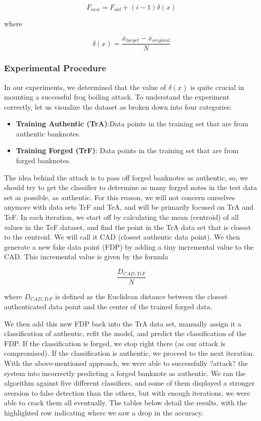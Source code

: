 \documentclass{article}
\begin{document}
\begin{equation}
F_{new} = F_{old} + (i - 1)\delta(x)
\end{equation}

where

\begin{equation}
\delta(x) = \frac{\bar{x}_{target}-\bar{x}_{original}}{N}
\end{equation}

\subsubsection{Experimental Procedure}

In our experiments, we determined that the value of $\delta(x)$ is quite crucial in mounting a successful frog boiling attack. To understand the experiment correctly, let us visualize the dataset as broken down into four categories: 

\begin{itemize}
  \item \textbf{Training Authentic (TrA)}:Data points in the training set that are from authentic banknotes.
  \item \textbf{Training Forged (TrF)}: Data points in the training set that are from forged banknotes.
\end{itemize}

The idea behind the attack is to pass off forged banknotes as authentic, so, we should try to get the classifier to determine as many forged notes in the test data set as possible, as authentic. For this reason, we will not concern ourselves anymore with data sets TrF and TeA, and will be primarily focused on TrA and TeF. In each iteration, we start off by calculating the mean (centroid) of all values in the TeF dataset, and find the point in the TrA data set that is closest to the centroid. We will call it CAD (closest authentic data point). We then generate a new fake data point (FDP) by adding a tiny incremental value to the CAD. This incremental value is given by the formula

\begin{equation}
\frac{D_{CAD,TeF}}{N}
\end{equation}

where $D_{CAD, TeF}$ is defined as the Euclidean distance between the closest authenticated data point and the center of the trained forged data.

We then add this new FDP back into the TrA data set, manually assign it a classification of authentic, refit the model, and predict the classification of the FDP. If the classification is forged, we stop right there (as our attack is compromised). If the classification is authentic, we proceed to the next iteration.
With the above-mentioned approach, we were able to successfully ?attack? the system into incorrectly predicting a forged banknote as authentic. We ran the algorithm against five different classifiers, and some of them displayed a stronger aversion to false detection than the others, but with enough iterations, we were able to crack them all eventually. The tables below detail the results, with the highlighted row indicating where we saw a drop in the accuracy.
\end{document}
